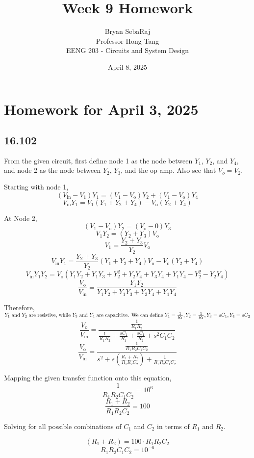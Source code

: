 \documentclass{article}
\title{Week 9 Homework}
\author{Bryan SebaRaj \\[0.7em] Professor Hong Tang \\[0.7em]  EENG 203 - Circuits and System Design}
\date{April 8, 2025}
\begin{document}
\maketitle

\section*{Homework for April 3, 2025}

\subsection*{16.102}

From the given circuit, first define node 1 as the node between $Y_1$, $Y_2$, and $Y_4$, and node 2 as the 
node between $Y_2$, $Y_3$, and the op amp. Also see that $V_o = V_2$.

\noindent Starting with node 1, 
$$(V_{\text{in}} - V_1) Y_1 = (V_1 - V_{\text{o}}) Y_2 + (V_1 - V_{\text{o}}) Y_4$$
$$V_{\text{in}} Y_1 = V_1(Y_1 + Y_2 + Y_4) - V_{\text{o}} (Y_2 + Y_4)$$

\noindent At Node 2, $$(V_1 - V_{\text{o}}) Y_2 = (V_{\text{o}} - 0) Y_3$$
$$V_1 Y_2 = (Y_2 + Y_3)V_{\text{o}}$$
$$V_1 = \frac{Y_2 + Y_3}{Y_2} V_{\text{o}}$$
$$V_{\text{in}} Y_1 = \frac{Y_2 + Y_3}{Y_2} (Y_1 + Y_2 + Y_4)V_{\text{o}} - V_{\text{o}} (Y_2 + Y_4)$$
$$V_{\text{in}}Y_1Y_2 = V_{\text{o}}(Y_1Y_2 + Y_1Y_3 + Y_2^2 + Y_2Y_4 + Y_3Y_4 + Y_1Y_4 - Y_2^2 - Y_2Y_4)$$
$$\frac{V_{\text{o}}}{V_{\text{in}}} = \frac{Y_1Y_2}{Y_1Y_2 + Y_1Y_3 + Y_3Y_4 + Y_1Y_4}$$

\noindent Therefore, $Y_1 \text{ and } Y_2 \text{ are resistive, while } Y_3 \text{ and } Y_4 \text{ are capacitive. We can define } Y_1 = \frac{1}{R_1}, Y_2 = \frac{1}{R_2}, \\ Y_3 = sC_1, Y_4 = sC_2$
$$\frac{V_{\text{o}}}{V_{\text{in}}} = \frac{\frac{1}{R_1R_2}}{\frac{1}{R_1R_2} + \frac{sC_1}{R_1} + \frac{sC_1}{R_2} + s^2C_1C_2}$$
$$\frac{V_{\text{o}}}{V_{\text{in}}} = \frac{\frac{1}{R_1R_2C_1C_2}}{s^2 + s\left(\frac{R_1 + R_2}{R_1R_2C_2}\right) + \frac{1}{R_1R_2C_1C_2}}$$

\noindent Mapping the given transfer function onto this equation,
$$\frac{1}{R_1R_2C_1C_2} = 10^6$$ $$\frac{R_1 + R_2}{R_1R_2C_2} = 100$$

\noindent Solving for all possible combinations of $C_1$ and $C_2$ in terms of $R_1$ and $R_2$.

$$(R_1 + R_2) = 100 \cdot R_1 R_2 C_2$$
$$R_1 R_2 C_1 C_2 = 10^{-6}$$
\end{document}
